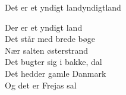 \begin{song}{Det er et yndigt land}{yndigtland}
\begin{vers}
Der er et yndigt land\\
Det står med brede bøge\\
Nær salten østerstrand\\
Det bugter sig i bakke, dal\\
Det hedder gamle Danmark\\
Og det er Frejas sal\\
\end{vers}
\end{song}

